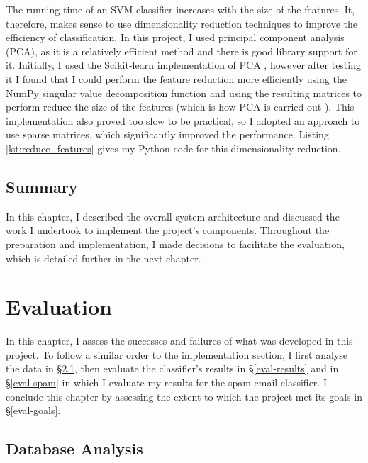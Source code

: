 \documentclass[12pt,a4paper,twoside,openright]{report}
\newcommand{\mylisting}[4]{}
\newcommand{\pylisting}[2]{\mylisting{Python}{py}{#1}{#2}}
\begin{document}
The running time of an SVM classifier increases with the size of the features. It, therefore, makes sense to use dimensionality reduction techniques to improve the efficiency of classification. In this project, I used principal component analysis (PCA), as it is a relatively efficient method and there is good library support for it. Initially, I used the Scikit-learn implementation of PCA \cite{sklearnpca}, however after testing it I found that I could perform the feature reduction more efficiently using the NumPy singular value decomposition function \cite{numpysvd} and using the resulting matrices to perform reduce the size of the features (which is how PCA is carried out \cite{svd}). This implementation also proved too slow to be practical, so I adopted an approach to use sparse matrices, which significantly improved the performance. Listing \ref{lst:reduce_features} gives my Python code for this dimensionality reduction.

\pylisting{A function using NumPy array operations to perform singular value decomposition on two sets of given features}{reduce_features}

\section{Summary}

In this chapter, I described the overall system architecture and discussed the work I undertook to implement the project's components. Throughout the preparation and implementation, I made decisions to facilitate the evaluation, which is detailed further in the next chapter.

\chapter{Evaluation} \label{eval}

In this chapter, I assess the successes and failures of what was developed in this project. To follow a similar order to the implementation section, I first analyse the data in \S\ref{eval-database}, then evaluate the classifier's results in \S\ref{eval-results} and in \S\ref{eval-spam} in which I evaluate my results for the spam email classifier. I conclude this chapter by assessing the extent to which the project met its goals in \S\ref{eval-goals}.

\section{Database Analysis} \label{eval-database}
\end{document}
